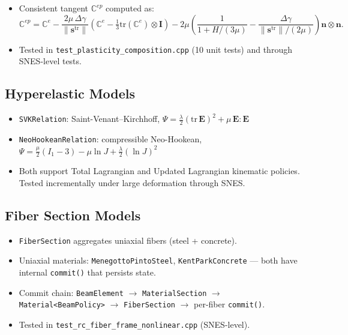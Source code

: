 \begin{itemize}
        update).
  \item Consistent tangent $\mathbb{C}^{ep}$ computed as:
        \[
          \mathbb{C}^{ep} = \mathbb{C}^e
            - \frac{2\mu\,\Delta\gamma}{\|\mathbf{s}^{\mathrm{tr}}\|}
              \left( \mathbb{C}^e - \tfrac{1}{3}\text{tr}(\mathbb{C}^e)
                \otimes \mathbf{I} \right)
            - 2\mu \left(\frac{1}{1+H/(3\mu)}
                         - \frac{\Delta\gamma}{\|\mathbf{s}^{\mathrm{tr}}\|/(2\mu)}
                   \right)
              \mathbf{n} \otimes \mathbf{n}.
        \]
  \item Tested in
        \texttt{test\_plasticity\_composition.cpp} (10 unit tests)
        and through SNES-level tests.
\end{itemize}

\subsection{Hyperelastic Models}

\begin{itemize}
  \item \texttt{SVKRelation}: Saint-Venant--Kirchhoff,
        $\Psi = \tfrac{\lambda}{2}(\text{tr}\,\mathbf{E})^2
                + \mu\,\mathbf{E}:\mathbf{E}$
  \item \texttt{NeoHookeanRelation}: compressible Neo-Hookean,
        $\Psi = \tfrac{\mu}{2}(I_1 - 3) - \mu\ln J
                + \tfrac{\lambda}{2}(\ln J)^2$
  \item Both support Total Lagrangian and Updated Lagrangian kinematic
        policies.  Tested incrementally under large deformation through
        SNES.
\end{itemize}

\subsection{Fiber Section Models}

\begin{itemize}
  \item \texttt{FiberSection} aggregates uniaxial fibers
        (steel + concrete).
  \item Uniaxial materials: \texttt{MenegottoPintoSteel},
        \texttt{KentParkConcrete} --- both have internal
        \texttt{commit()} that persists state.
  \item Commit chain: \texttt{BeamElement} $\to$ \texttt{MaterialSection}
        $\to$ \texttt{Material<BeamPolicy>} $\to$ \texttt{FiberSection}
        $\to$ per-fiber \texttt{commit()}.
  \item Tested in \texttt{test\_rc\_fiber\_frame\_nonlinear.cpp}
        (SNES-level).
\end{itemize}

